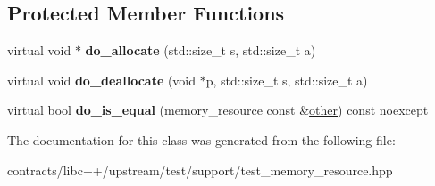 \subsection*{Protected Member Functions}
\begin{DoxyCompactItemize}
\item 
\mbox{\label{class_test_resource_imp_aba09f744c22e9ce755267aa3bb9eae6f}} 
virtual void $\ast$ {\bfseries do\+\_\+allocate} (std\+::size\+\_\+t s, std\+::size\+\_\+t a)
\item 
\mbox{\label{class_test_resource_imp_a6ae5aa8ce7c4964b91656049e54ad33f}} 
virtual void {\bfseries do\+\_\+deallocate} (void $\ast$p, std\+::size\+\_\+t s, std\+::size\+\_\+t a)
\item 
\mbox{\label{class_test_resource_imp_adf86cfed98c86aef0b01ef9eb11e0e79}} 
virtual bool {\bfseries do\+\_\+is\+\_\+equal} (memory\+\_\+resource const \&\mbox{\hyperlink{structother}{other}}) const noexcept
\end{DoxyCompactItemize}


The documentation for this class was generated from the following file\+:\begin{DoxyCompactItemize}
\item 
contracts/libc++/upstream/test/support/test\+\_\+memory\+\_\+resource.\+hpp\end{DoxyCompactItemize}
